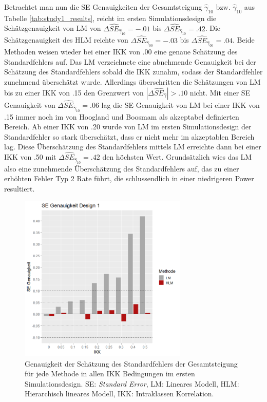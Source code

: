 \documentclass[12pt, a4paper]{article}\usepackage[]{graphicx}\usepackage[]{color}
\begin{document}
Betrachtet man nun die SE Genauigkeiten der Gesamtsteigung $\widehat{\gamma}_{10}$ bzw. $\widehat{\gamma}_{10}$ aus Tabelle \ref{tab:study1_results}, reicht im ersten Simulationsdesign die Schätzgenauigkeit von LM von $\Delta\widehat{SE}_{\widehat{\gamma}_{10}} = -.01$ bis $\Delta\widehat{SE}_{\widehat{\gamma}_{10}} = .42$. Die Schätzgenauigkeit des HLM reichte von $\Delta\widehat{SE}_{\widehat{\gamma}_{00}} = -.03$ bis $\Delta\widehat{SE}_{\widehat{\gamma}_{00}} = .04$. Beide Methoden weisen wieder bei einer IKK von .00 eine genaue Schätzung des Standardfehlers auf. Das LM verzeichnete eine abnehmende Genauigkeit bei der Schätzung des Standardfehlers sobald die IKK zunahm, sodass der Standardfehler zunehmend überschätzt wurde. Allerdings überschritten die Schätzungen von LM bis zu einer IKK von .15 den Grenzwert von $|\Delta\widehat{SE}_{\widehat{\gamma}}| > .10$ nicht. Mit einer SE Genauigkeit von $\Delta\widehat{SE}_{\widehat{\gamma}_{10}} = .06$ lag die SE Genauigkeit von LM bei einer IKK von .15 immer noch im von Hoogland und Boosmam \citeyearpar{hooglandboosma1998robustness} als akzeptabel definierten Bereich. Ab einer IKK von .20 wurde von LM im ersten Simulationsdesign der Standardfehler so stark überschätzt, dass er nicht mehr im akzeptablen Bereich lag. Diese Überschätzung des Standardfehlers mittels LM erreichte dann bei einer IKK von .50 mit $\Delta\widehat{SE}_{\widehat{\gamma}_{10}} = .42$ den höchsten Wert. Grundsätzlich wies das LM also eine zunehmende Überschätzung des Standardfehlers auf, das zu einer erhöhten Fehler Typ 2 Rate führt, die schlussendlich in einer niedrigeren Power resultiert. 
\begin{figure}[t!]
\centering
\captionsetup{width=8cm}
\includegraphics[width=8cm, height=8cm]{./figures/se_genauigkeit_design1}
\caption{Genauigkeit der Schätzung des Standardfehlers der Gesamtsteigung für jede Methode in allen IKK Bedingungen im ersten Simulationsdesign. SE: \textit{Standard Error}, LM: Lineares Modell, HLM: Hierarchisch lineares Modell, IKK: Intraklassen Korrelation.}
\label{fig:se_genauigkeit_design1}
\end{figure}
\end{document}
